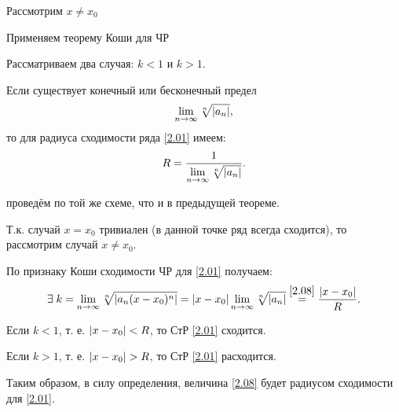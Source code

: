 \begin{col-answer-preambule}
\end{col-answer-preambule}

\begin{plan}
\item Рассмотрим  $x \neq x_0$
\item Применяем теорему Коши для ЧР
\item Рассматриваем два случая: $k < 1$ и $k > 1$.
\end{plan}
\begin{theorem}
	Если существует конечный или бесконечный предел
	\begin{equation}
	\label{2.07}
	\lim\limits_{n\to\infty} \sqrt[n]{\left\lvert a_n \right\rvert},
	\end{equation}
	то для радиуса сходимости ряда \eqref{2.01} имеем:
	\begin{equation}
	\label{2.08}
	R = \dfrac{1}{\lim\limits_{n\to\infty} \sqrt[n]{\left\lvert a_n \right\rvert}}.
	\end{equation}
\end{theorem}
\begin{proofUndotted} проведём по той же схеме, что и в предыдущей теореме.

	Т.к. случай $ x=x_0 $ тривиален (в данной точке ряд всегда сходится), то рассмотрим случай $ x \ne x_0 $.

	По признаку Коши сходимости ЧР для \eqref{2.01} получаем:
	\begin{equation*}
	\exists \; k = \lim\limits_{n\to\infty} \sqrt[n]{\left\lvert a_n (x-x_0)^n \right\rvert} =
	\left\lvert x-x_0 \right\rvert \lim\limits_{n\to\infty} \sqrt[n]{\left\lvert a_n \right\rvert} \overset{\eqref{2.08}}{=} \dfrac{\left\lvert x-x_0 \right\rvert}{R}.
	\end{equation*}

	Если $ k < 1 $, т. е. $ \left\lvert x - x_0 \right\rvert < R $, то СтР \eqref{2.01} сходится.

	Если $ k > 1 $, т. е. $ \left\lvert x - x_0 \right\rvert > R $, то СтР \eqref{2.01} расходится.


	Таким образом, в силу определения, величина \eqref{2.08} будет радиусом сходимости для \eqref{2.01}.
\end{proofUndotted}

